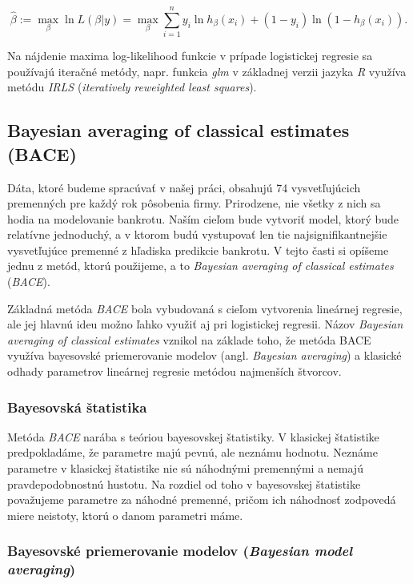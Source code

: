 \[
\hat{\beta} := \max_{\beta} \ln L(\beta | y) = \max_{\beta} \sum_{i = 1}^n y_i \ln{h_{\beta}(x_i)} + (1 - y_i) \ln{(1 - h_{\beta}(x_i))}.
\]

Na nájdenie maxima log-likelihood funkcie v prípade logistickej regresie sa používajú iteračné metódy,
napr. funkcia \emph{glm} v základnej verzii jazyka \emph{R} využíva metódu \emph{IRLS} (\emph{iteratively reweighted least squares}).

\subsection{Bayesian averaging of classical estimates (BACE)}

Dáta, ktoré budeme spracúvať v našej práci, obsahujú 74 vysvetľujúcich premenných pre každý rok pôsobenia firmy.
Prirodzene, nie všetky z nich sa hodia na modelovanie bankrotu.
Naším cieľom bude vytvoriť model, ktorý bude relatívne jednoduchý, a v ktorom budú vystupovať len tie najsignifikantnejšie vysvetľujúce premenné z hľadiska predikcie bankrotu.
V tejto časti si opíšeme jednu z metód, ktorú použijeme, a to \emph{Bayesian averaging of classical estimates} (\emph{BACE}).

Základná metóda \emph{BACE} bola vybudovaná s cieľom vytvorenia lineárnej regresie, ale jej hlavnú ideu možno ľahko využiť aj pri logistickej regresii.
Názov \emph{Bayesian averaging of classical estimates} vznikol na základe toho, že metóda BACE využíva bayesovské priemerovanie modelov (angl. \emph{Bayesian averaging}) a klasické odhady parametrov lineárnej regresie metódou najmenších štvorcov.

\subsubsection{Bayesovská štatistika}

Metóda \emph{BACE} narába s teóriou bayesovskej štatistiky.
V klasickej štatistike predpokladáme, že parametre majú pevnú, ale neznámu hodnotu.
Neznáme parametre v klasickej štatistike nie sú náhodnými premennými a nemajú pravdepodobnostnú hustotu.
Na rozdiel od toho v bayesovskej štatistike považujeme parametre za náhodné premenné, pričom ich náhodnosť zodpovedá miere neistoty, ktorú o danom parametri máme.

\subsubsection{Bayesovské priemerovanie modelov (\emph{Bayesian model averaging})}

